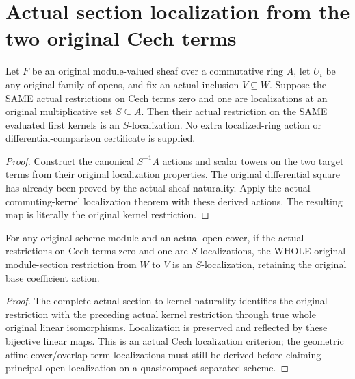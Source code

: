 \section{Actual section localization from the two original Cech terms}

\begin{lemma}
\label{lem:sheaf-cech-kernel-localization}
\leanok
{}
Let $F$ be an original module-valued sheaf over a commutative
ring $A$, let $U_i$ be any original family of opens, and fix
an actual inclusion $V\subseteq W$. Suppose the SAME actual
restrictions on Cech terms zero and one are localizations at
an original multiplicative set $S\subseteq A$. Then their
actual restriction on the SAME evaluated first kernels is
an $S$-localization. No extra localized-ring action or
differential-comparison certificate is supplied.
\end{lemma}
\begin{proof}
Construct the canonical $S^{-1}A$ actions and scalar towers
on the two target terms from their original localization
properties. The original differential square has already
been proved by the actual sheaf naturality. Apply the actual
commuting-kernel localization theorem with these derived
actions. The resulting map is literally the original kernel
restriction.
\end{proof}

\begin{proposition}
\label{prop:scheme-module-cech-localization-criterion}
\leanok
{}
For any original scheme module and an actual open cover,
if the actual restrictions on Cech terms zero and one are
$S$-localizations, the WHOLE original module-section
restriction from $W$ to $V$ is an $S$-localization, retaining
the original base coefficient action.
\end{proposition}
\begin{proof}
The complete actual section-to-kernel naturality identifies
the original restriction with the preceding actual kernel
restriction through true whole original linear isomorphisms.
Localization is preserved and reflected by these bijective
linear maps. This is an actual Cech localization criterion;
the geometric affine cover/overlap term localizations must
still be derived before claiming principal-open localization
on a quasicompact separated scheme.
\end{proof}
